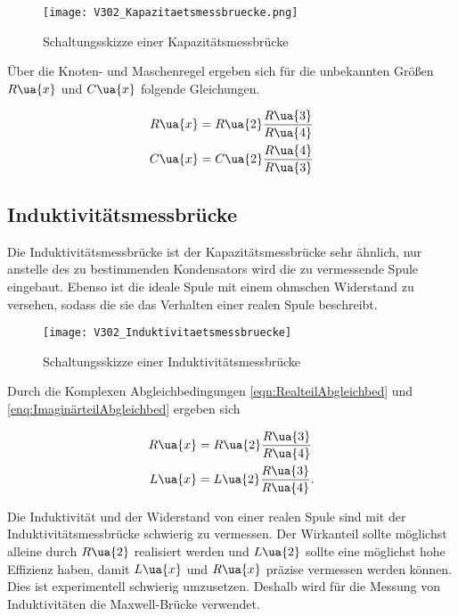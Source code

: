 \begin{figure}
  \texttt{[image: V302\_Kapazitaetsmessbruecke.png]}
  \caption{Schaltungsskizze einer Kapazitätsmessbrücke\cite{anleitung01}}
  \label{fig:Kapazitätsmessbrücke}
\end{figure}

Über die Knoten- und Maschenregel ergeben sich für die unbekannten Größen
$R\ua{x}$ und $C\ua{x}$ folgende Gleichungen.

\begin{align}
  R\ua{x} &= R\ua{2}\frac{R\ua{3}}{R\ua{4}}\label{KapazitätsmessbrückeRx}\\
  C\ua{x} &= C\ua{2}\frac{R\ua{4}}{R\ua{3}}\label{KapazitätsmessbrückeLx}
\end{align}

\subsection{Induktivitätsmessbrücke}

Die Induktivitätsmessbrücke ist der Kapazitätsmessbrücke sehr ähnlich, nur anstelle
des zu bestimmenden Kondensators wird die zu vermessende Spule eingebaut.
Ebenso ist die ideale Spule mit einem ohmschen Widerstand zu versehen, sodass
die sie das Verhalten einer realen Spule beschreibt.
\begin{figure}
  \texttt{[image: V302\_Induktivitaetsmessbruecke]}
  \caption{Schaltungsskizze einer Induktivitätsmessbrücke\cite{anleitung01}}
  \label{fig:Induktivitätsmessbrücke}
\end{figure}

Durch die Komplexen Abgleichbedingungen \eqref{eqn:RealteilAbgleichbed} und
\eqref{enq:ImaginärteilAbgleichbed} ergeben sich

\begin{align}
  R\ua{x} &= R\ua{2}\frac{R\ua{3}}{R\ua{4}}\label{InduktivitätmessbrückeRx}\\
  L\ua{x} &= L\ua{2}\frac{R\ua{3}}{R\ua{4}}.\label{InduktivitätmessbrückeLx}
\end{align}

Die Induktivität und der Widerstand von einer realen Spule sind mit der
Induktivitätsmessbrücke schwierig zu vermessen. Der Wirkanteil sollte
möglichst alleine durch $R\ua{2}$ realisiert werden und $L\ua{2}$ sollte
eine möglichst hohe Effizienz haben, damit $L\ua{x}$ und $R\ua{x}$ präzise vermessen
werden können. Dies ist experimentell schwierig umzusetzen.
Deshalb wird für die Messung von Induktivitäten die Maxwell-Brücke verwendet.

